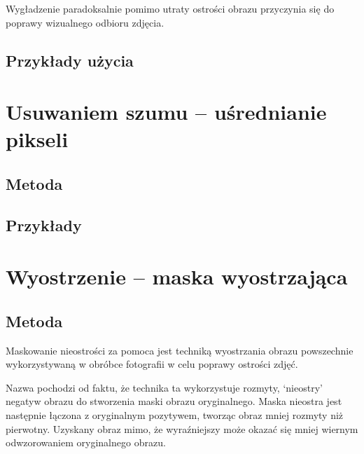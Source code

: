\documentclass[]{mwart}
\begin{document}
Wygładzenie paradoksalnie pomimo utraty ostrości obrazu przyczynia się do poprawy wizualnego odbioru zdjęcia.

\subsection{Przykłady użycia}






\section{Usuwaniem szumu -- uśrednianie pikseli }
\subsection{Metoda}

\subsection{Przykłady}




\section{Wyostrzenie -- maska wyostrzająca      }

\subsection{Metoda}
Maskowanie nieostrości za pomoca jest techniką wyostrzania obrazu
powszechnie wykorzystywaną w obróbce fotografii w celu poprawy ostrości zdjęć.

Nazwa pochodzi od faktu, że technika ta wykorzystuje rozmyty,
`nieostry' negatyw obrazu do stworzenia maski obrazu oryginalnego.
Maska nieostra jest następnie łączona z oryginalnym pozytywem,
tworząc obraz mniej rozmyty niż pierwotny. Uzyskany obraz mimo, że wyraźniejszy
może okazać się mniej wiernym odwzorowaniem oryginalnego obrazu.
\end{document}
